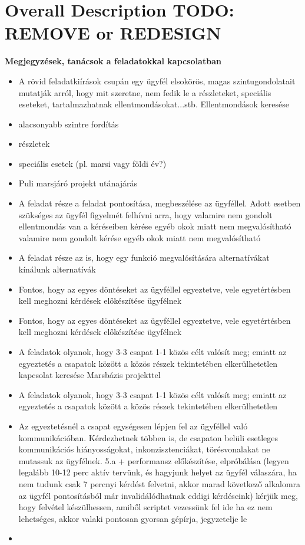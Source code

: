 \documentclass[12pt]{report}
\begin{document}
\chapter{Overall Description TODO: REMOVE or REDESIGN}

\textbf{Megjegyzések, tanácsok a feladatokkal kapcsolatban} 
\begin{itemize}
    \item A rövid feladatkiírások csupán egy ügyfél elsokörös, magas szintugondolatait mutatják arról, hogy mit szeretne, nem fedik le a részleteket, speciális eseteket, tartalmazhatnak ellentmondásokat...stb.
    Ellentmondások keresése
    \item alacsonyabb szintre fordítás
    \item részletek
    \item speciális esetek (pl. marsi vagy földi év?)
    \item Puli marsjáró projekt utánajárás
    \item A feladat része a feladat pontosítása, megbeszélése az ügyféllel. Adott esetben szükséges az ügyfél figyelmét felhívni arra, hogy valamire nem gondolt  ellentmondás van a kéréseiben  kérése egyéb okok miatt nem megvalósítható    
    valamire nem gondolt kérése egyéb okok miatt nem megvalósítható
    \item A feladat része az is, hogy egy funkció megvalósítására alternatívákat kínálunk    
    alternatívák
    \item Fontos, hogy az egyes döntéseket az ügyféllel egyeztetve, vele egyetértésben kell meghozni
    kérdések előkészítése ügyfélnek
    \item Fontos, hogy az egyes döntéseket az ügyféllel egyeztetve, vele egyetértésben kell meghozni
    kérdések előkészítése ügyfélnek
    \item A feladatok olyanok, hogy 3-3 csapat 1-1 közös célt valósít meg; emiatt az egyeztetés a csapatok között a közös részek tekintetében elkerülhetetlen
    kapcsolat keresése Marsbázis projekttel
    \item A feladatok olyanok, hogy 3-3 csapat 1-1 közös célt valósít meg; emiatt az egyeztetés a csapatok között a közös részek tekintetében elkerülhetetlen
    \item Az egyeztetésnél a csapat egységesen lépjen fel az ügyféllel való kommunikációban. Kérdezhetnek többen is, de csapaton belüli esetleges kommunikációs hiányosságokat, inkonzisztenciákat, törésvonalakat ne mutassuk az ügyfélnek.
    5.a + performansz előkészítése, elpróbálása (legyen legalább 10-12 perc aktív tervünk, és hagyjunk helyet az ügyfél válaszára, ha nem tudunk csak 7 percnyi kérdést felvetni, akkor marad következő alkalomra  az ügyfél pontosításból már invalidálódhatnak eddigi kérdéseink)
    kérjük meg, hogy felvétel készülhessen, amiből scriptet vezessünk fel ide
    ha ez nem lehetséges, akkor valaki pontosan gyorsan gépírja, jegyzetelje le
    \item 

\end{itemize}                  
\end{document}
